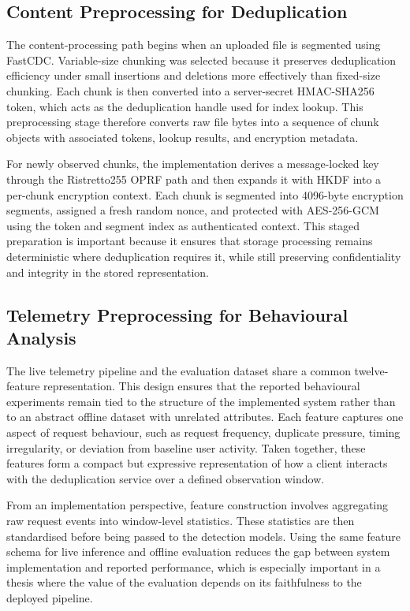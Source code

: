 \documentclass[12pt,a4paper,oneside]{report}
\begin{document}
\subsection{Content Preprocessing for Deduplication}

The content-processing path begins when an uploaded file is segmented using FastCDC. Variable-size chunking was selected because it preserves deduplication efficiency under small insertions and deletions more effectively than fixed-size chunking. Each chunk is then converted into a server-secret HMAC-SHA256 token, which acts as the deduplication handle used for index lookup. This preprocessing stage therefore converts raw file bytes into a sequence of chunk objects with associated tokens, lookup results, and encryption metadata.

For newly observed chunks, the implementation derives a message-locked key through the Ristretto255 OPRF path and then expands it with HKDF into a per-chunk encryption context. Each chunk is segmented into 4096-byte encryption segments, assigned a fresh random nonce, and protected with AES-256-GCM using the token and segment index as authenticated context. This staged preparation is important because it ensures that storage processing remains deterministic where deduplication requires it, while still preserving confidentiality and integrity in the stored representation.

\subsection{Telemetry Preprocessing for Behavioural Analysis}

The live telemetry pipeline and the evaluation dataset share a common twelve-feature representation.
This design ensures that the reported behavioural experiments remain tied to the structure of the implemented system rather than to an abstract offline dataset with unrelated attributes.
Each feature captures one aspect of request behaviour, such as request frequency, duplicate pressure, timing irregularity, or deviation from baseline user activity.
Taken together, these features form a compact but expressive representation of how a client interacts with the deduplication service over a defined observation window.

From an implementation perspective, feature construction involves aggregating raw request events into window-level statistics.
These statistics are then standardised before being passed to the detection models.
Using the same feature schema for live inference and offline evaluation reduces the gap between system implementation and reported performance, which is especially important in a thesis where the value of the evaluation depends on its faithfulness to the deployed pipeline.
\end{document}
